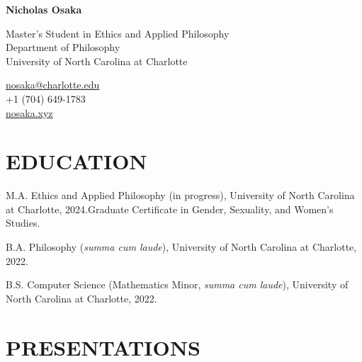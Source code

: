 \documentclass{article}
\begin{document}
\raggedright{}
\huge{\textbf{Nicholas Osaka}}
\normalsize

\vspace{1em}
\begin{minipage}[t]{0.700\textwidth}
    Master's Student in Ethics and Applied Philosophy\\
    Department of Philosophy \\
    University of North Carolina at Charlotte
\end{minipage}
\begin{minipage}[t]{0.275\textwidth}
    \flushright{}
    \href{mailto:nosaka@charlotte.edu}{nosaka@charlotte.edu} \\
    +1 (704) 649-1783\\
    \href{https://nosaka.xyz}{nosaka.xyz}
\end{minipage}

\section*{\normalsize{\MakeUppercase{Education}}}
\begin{tablist}
    \item[M.A.]  \tab{}Ethics and Applied Philosophy (in progress), University of North Carolina at Charlotte, 2024.\newline{}Graduate Certificate in Gender, Sexuality, and Women's Studies.
    \item[B.A.]  \tab{}Philosophy (\textit{summa cum laude}), University of North Carolina at Charlotte, 2022.
    \item[B.S.]  \tab{}Computer Science (Mathematics Minor, \textit{summa cum laude}), University of North Carolina at Charlotte, 2022.
\end{tablist}


\section*{\normalsize{\MakeUppercase{Presentations}}}
\end{document}
